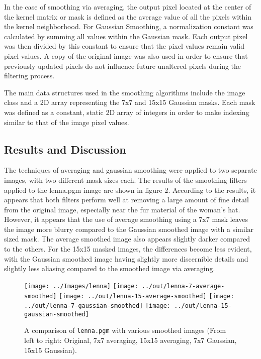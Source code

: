 \documentclass[headings=optiontoheadandtoc,listof=totoc,parskip=full]{scrartcl}
\begin{document}
In the case of smoothing via averaging, the output pixel located at the center of the kernel matrix or mask is defined as the average value of all the pixels within the kernel neighborhood. For Gaussian Smoothing, a normalization constant was calculated by summing all values within the Gaussian mask. Each output pixel was then divided by this constant to ensure that the pixel values remain valid pixel values. A copy of the original image was also used in order to ensure that previously updated pixels do not influence future unaltered pixels during the filtering process.

The main data structures used in the smoothing algorithms include the image class and a 2D array representing the 7x7 and 15x15 Gaussian masks. Each mask was defined as a constant, static 2D array of integers in order to make indexing similar to that of the image pixel values.


\subsection{Results and Discussion}

The techniques of averaging and gaussian smoothing were applied to two separate images, with two different mask sizes each. The results of the smoothing filters applied to the lenna.pgm image are shown in figure 2. According to the results, it appears that both filters perform well at removing a large amount of fine detail from the original image, especially near the fur material of the woman’s hat. However, it appears that the use of average smoothing using a 7x7 mask leaves the image more blurry compared to the Gaussian smoothed image with a similar sized mask. The average smoothed image also appears slightly darker compared to the others. For the 15x15 masked images, the differences become less evident, with the Gaussian smoothed image having slightly more discernible details and slightly less aliasing compared to the smoothed image via averaging. 


\begin{figure}[ht]
	\centering
	\texttt{[image: ../Images/lenna]}
	\texttt{[image: ../out/lenna-7-average-smoothed]}
	\texttt{[image: ../out/lenna-15-average-smoothed]}
	\texttt{[image: ../out/lenna-7-gaussian-smoothed]}
	\texttt{[image: ../out/lenna-15-gaussian-smoothed]}
	\caption{A comparison of \texttt{lenna.pgm} with various smoothed images (From left to right: Original, 7x7 averaging, 15x15 averaging, 7x7 Gaussian, 15x15 Gaussian).}
	\label{fig:smoothing-result-1}
\end{figure}
\end{document}
